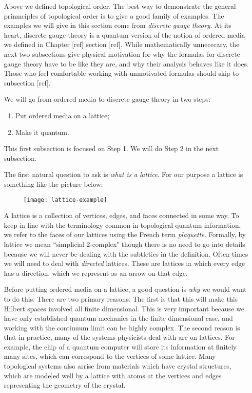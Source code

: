 Above we defined topological order. The best way to demonstrate the general prinmciples of topological order is to give a good family of examples. The examples we will give in this section come from \textit{discrete gauge theory}. At its heart, discrete gauge theory is a quantum version of the notion of ordered media we defined in Chapter [ref] section [ref]. While mathematically unnececary, the next two subsections give physical motivation for why the formulas for discrete gauge theory have to be like they are, and why their analysis behaves like it does. Those who feel comfortable working with unmotivated formulas should skip to subsection [ref].

We will go from ordered media to discrete gauge theory in two steps:

\begin{enumerate}[Step 1:]
\item Put ordered media on a lattice;
\item Make it quantum.
\end{enumerate}

This first subsection is focused on Step 1. We will do Step 2 in the next subsection.

The first natural question to ask is \textit{what is a lattice}. For our purpose a lattice is something like the picture below:

\begin{figure}[h]
\begin{center}
\texttt{[image: lattice-example]}
\end{center}
\end{figure}

A lattice is a collection of vertices, edges, and faces connected in some way. To keep in line with the terminology common in topological quantum information, we refer to the faces of our lattices using the French term \textit{plaquette}. Formally, by lattice we mean ``simplicial 2-complex" though there is no need to go into details because we will never be dealing with the subtleties in the definition. Often times we will need to deal with \textit{directed} lattices. These are lattices in which every edge has a direction, which we represent as an arrow on that edge.

Before putting ordered media on a lattice, a good question is \textit{why} we would want to do this. There are two primary reasons. The first is that this will make this Hilbert spaces involved all finite dimensional. This is very important because we have only established quantum mechanics in the finite dimensional case, and working with the continuum limit can be highly complex. The second reason is that in practice, many of the systems physicists deal with are on lattices. For example, the chip of a quantum computer will store its information at finitely many sites, which can correspond to the vertices of some lattice. Many topological systems also arrise from materials which have crystal structures, which are modeled well by a lattice with atoms at the vertices and edges representing the geometry of the crystal.

